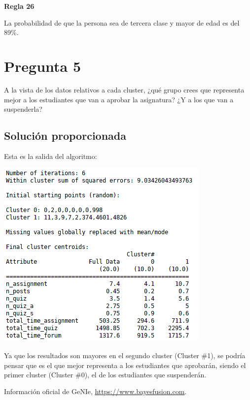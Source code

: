 \documentclass{article}
\begin{document}
\textbf{Regla 26}

La probabilidad de que la persona sea de tercera clase y mayor de edad es del 89\%.

\section{Pregunta 5}

A la vista de los datos relativos a cada cluster, ¿qué grupo crees que representa mejor a los
estudiantes que van a aprobar la asignatura? ¿Y a los que van a suspenderla?

\subsection{Solución proporcionada}

Esta es la salida del algoritmo:

\begin{center}
\includegraphics[scale=0.5]{images/cluster.png}
\end{center}

Ya que los resultados son mayores en el segundo cluster (Cluster \#1), se podría pensar que es el que mejor representa a los estudiantes que aprobarán, siendo el primer cluster (Cluster \#0), el de los estudiantes que suspenderán.

\begin{thebibliography}{9}
 Información oficial de GeNIe, \url{https://www.bayesfusion.com}.
\end{thebibliography}
\end{document}
